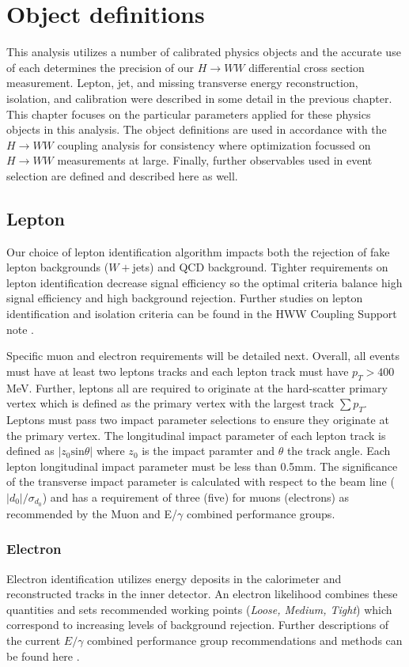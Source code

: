\section{Object definitions}
This analysis utilizes a number of calibrated physics objects and the accurate use of each determines the precision of our $H\rightarrow WW$ differential cross section measurement. Lepton, jet, and missing transverse energy reconstruction, isolation, and calibration were described in some detail in the previous chapter. This chapter focuses on the particular parameters applied for these physics objects in this analysis. The object definitions are used in accordance with the $H\rightarrow WW$ coupling analysis for consistency where optimization focussed on $H \rightarrow WW$ measurements at large. Finally, further observables used in event selection are defined and described here as well. 

\subsection{Lepton}

Our choice of lepton identification algorithm impacts both the rejection of fake lepton backgrounds ($W+$jets) and QCD background. Tighter requirements on lepton identification decrease signal efficiency so the optimal criteria balance high signal efficiency and high background rejection. Further studies on lepton identification and isolation criteria can be found in the HWW Coupling Support note \cite{HWWCoupling}.

Specific muon and electron requirements will be detailed next. Overall, all events must have at least two leptons tracks and each lepton track must have $p_T>400$MeV. Further, leptons all are required to originate at the hard-scatter primary vertex which is defined as the primary vertex with the largest track $\sum p_T$. Leptons must pass two impact parameter selections to ensure they originate at the primary vertex. The longitudinal impact parameter of each lepton track is defined as $|z_0\mathrm{sin}\theta|$ where $z_0$ is the impact paramter and $\theta$ the track angle. Each lepton longitudinal impact parameter must be less than 0.5mm. The significance of the transverse impact parameter is calculated with respect to the beam line ($|d_0|/\sigma_{d_0}$) and has a requirement of three (five) for muons (electrons) as recommended by the Muon and E/$\gamma$ combined performance groups. 

\subsubsection{Electron}
Electron identification utilizes energy deposits in the calorimeter and reconstructed tracks in the inner detector. An electron likelihood combines these quantities and sets recommended working points (\textit{Loose, Medium, Tight}) which correspond to increasing levels of background rejection. Further descriptions of the current $E/\gamma$ combined performance group recommendations and methods can be found here \cite{ElectronPhotonPerformance}.

